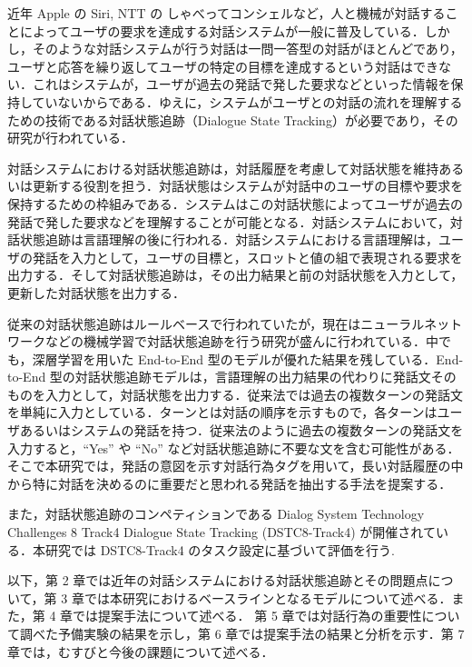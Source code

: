 近年 Apple の Siri, NTT の しゃべってコンシェルなど，人と機械が対話することによってユーザの要求を達成する対話システムが一般に普及している．しかし，そのような対話システムが行う対話は一問一答型の対話がほとんどであり，ユーザと応答を繰り返してユーザの特定の目標を達成するという対話はできない．これはシステムが，ユーザが過去の発話で発した要求などといった情報を保持していないからである．ゆえに，システムがユーザとの対話の流れを理解するための技術である対話状態追跡（Dialogue State Tracking）が必要であり，その研究が行われている．\par
対話システムにおける対話状態追跡は，対話履歴を考慮して対話状態を維持あるいは更新する役割を担う．対話状態はシステムが対話中のユーザの目標や要求を保持するための枠組みである．システムはこの対話状態によってユーザが過去の発話で発した要求などを理解することが可能となる．対話システムにおいて，対話状態追跡は言語理解の後に行われる．対話システムにおける言語理解は，ユーザの発話を入力として，ユーザの目標と，スロットと値の組で表現される要求を出力する．そして対話状態追跡は，その出力結果と前の対話状態を入力として，更新した対話状態を出力する．\par
従来の対話状態追跡はルールベースで行われていたが，現在はニューラルネットワークなどの機械学習で対話状態追跡を行う研究が盛んに行われている．中でも，深層学習を用いた End-to-End 型のモデル\cite{nbt,e2e}が優れた結果を残している．End-to-End 型の対話状態追跡モデルは，言語理解の出力結果の代わりに発話文そのものを入力として，対話状態を出力する．従来法では過去の複数ターンの発話文を単純に入力としている．ターンとは対話の順序を示すもので，各ターンはユーザあるいはシステムの発話を持つ．従来法のように過去の複数ターンの発話文を入力すると，“Yes” や “No” など対話状態追跡に不要な文を含む可能性がある．そこで本研究では，発話の意図を示す対話行為タグを用いて，長い対話履歴の中から特に対話を決めるのに重要だと思われる発話を抽出する手法を提案する．\par
また，対話状態追跡のコンペティションである  Dialog System Technology Challenges 8 Track4 Dialogue State Tracking (DSTC8-Track4)\cite{dstc8} が開催されている．本研究では DSTC8-Track4 のタスク設定に基づいて評価を行う.\par
以下，第 2 章では近年の対話システムにおける対話状態追跡とその問題点について，第 3 章では本研究におけるベースラインとなるモデルについて述べる．また，第 4 章では提案手法について述べる．
第 5 章では対話行為の重要性について調べた予備実験の結果を示し，第 6 章では提案手法の結果と分析を示す．第 7 章では，むすびと今後の課題について述べる．
